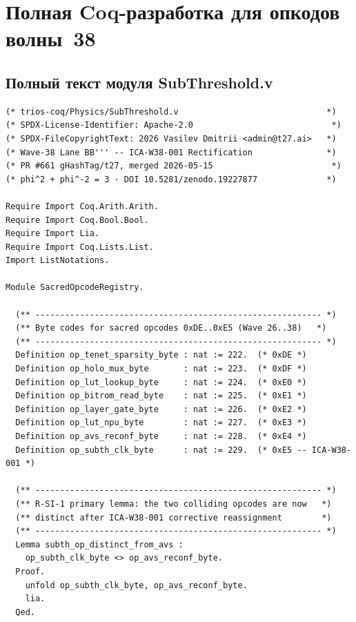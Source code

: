 \section{Полная Coq-разработка для опкодов волны~38}
\label{app:full_coq}


\subsection{Полный текст модуля SubThreshold.v}

\begin{lstlisting}[language=Coq,
  caption={Полный модуль SubThreshold.v (ICA-W38-001,
    PR~\#661~\cite{pr661_t27})},
  label={lst:full_coq}]
(* trios-coq/Physics/SubThreshold.v                              *)
(* SPDX-License-Identifier: Apache-2.0                            *)
(* SPDX-FileCopyrightText: 2026 Vasilev Dmitrii <admin@t27.ai>   *)
(* Wave-38 Lane BB''' -- ICA-W38-001 Rectification               *)
(* PR #661 gHashTag/t27, merged 2026-05-15                        *)
(* phi^2 + phi^-2 = 3 · DOI 10.5281/zenodo.19227877              *)

Require Import Coq.Arith.Arith.
Require Import Coq.Bool.Bool.
Require Import Lia.
Require Import Coq.Lists.List.
Import ListNotations.

Module SacredOpcodeRegistry.

  (** ---------------------------------------------------------- *)
  (** Byte codes for sacred opcodes 0xDE..0xE5 (Wave 26..38)   *)
  (** ---------------------------------------------------------- *)
  Definition op_tenet_sparsity_byte : nat := 222.  (* 0xDE *)
  Definition op_holo_mux_byte       : nat := 223.  (* 0xDF *)
  Definition op_lut_lookup_byte     : nat := 224.  (* 0xE0 *)
  Definition op_bitrom_read_byte    : nat := 225.  (* 0xE1 *)
  Definition op_layer_gate_byte     : nat := 226.  (* 0xE2 *)
  Definition op_lut_npu_byte        : nat := 227.  (* 0xE3 *)
  Definition op_avs_reconf_byte     : nat := 228.  (* 0xE4 *)
  Definition op_subth_clk_byte      : nat := 229.  (* 0xE5 -- ICA-W38-001 *)

  (** ---------------------------------------------------------- *)
  (** R-SI-1 primary lemma: the two colliding opcodes are now   *)
  (** distinct after ICA-W38-001 corrective reassignment        *)
  (** ---------------------------------------------------------- *)
  Lemma subth_op_distinct_from_avs :
    op_subth_clk_byte <> op_avs_reconf_byte.
  Proof.
    unfold op_subth_clk_byte, op_avs_reconf_byte.
    lia.
  Qed.


\end{lstlisting}
